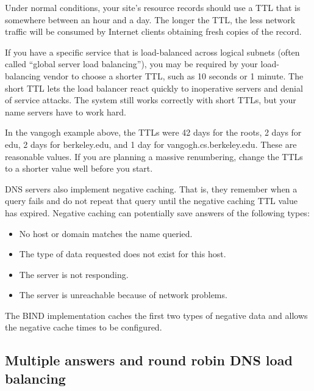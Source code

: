 Under normal conditions, your site's resource records should use a TTL
that is somewhere between an hour and a day. The longer the TTL, the
less network traffic will be consumed by Internet clients obtaining
fresh copies of the record.

If you have a specific service that is load-balanced across logical
subnets (often called ``global server load balancing''), you may be
required by your load-balancing vendor to choose a shorter TTL, such as
10 seconds or 1 minute. The short TTL lets the load balancer react
quickly to inoperative servers and
\protect\hypertarget{part0024_split_016.htmlux5cux23_idIndexMarker2042}{}{}denial
of service attacks. The system still works correctly with short TTLs,
but your name servers have to work hard.

In the vangogh example above, the TTLs were 42 days for the roots, 2
days for edu, 2 days for berkeley.edu, and 1 day for
vangogh.cs.berkeley.edu. These are reasonable values. If you are
planning a massive renumbering, change the TTLs to a shorter value well
before you start.

DNS servers also implement
\protect\hypertarget{part0024_split_016.htmlux5cux23_idIndexMarker2043}{}{}\protect\hypertarget{part0024_split_016.htmlux5cux23_idIndexMarker2044}{}{}negative
caching. That is, they remember when a query fails and do not repeat
that query until the negative caching TTL value has expired. Negative
caching can potentially save answers of the following types:

\begin{itemize}
\tightlist
\item
  No host or domain matches the name queried.
\item
  The type of data requested does not exist for this host.
\item
  The server is not responding.
\item
  The server is unreachable because of network problems.
\end{itemize}

The BIND implementation caches the first two types of negative data and
allows the negative cache times to be configured.

\protect\hypertarget{part0024_split_017.html}{}{}

\hypertarget{part0024_split_017.htmlux5cux23_idContainer1069}{}
\hypertarget{part0024_split_017.htmlux5cux23calibre_pb_16}{%
\subsection[Multiple answers and round robin DNS load
balancing]{\texorpdfstring{\protect\hypertarget{part0024_split_017.htmlux5cux23_idTextAnchor862}{}{}Multiple
answers and round robin DNS load
balancing}{Multiple answers and round robin DNS load balancing}}\label{part0024_split_017.htmlux5cux23calibre_pb_16}}

